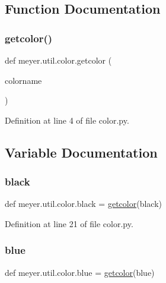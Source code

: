 \subsection{Function Documentation}
\mbox{\label{namespacemeyer_1_1util_1_1color_a777b068ba3d7bb397cb83871d691ecf5}} 
\subsubsection{\texorpdfstring{getcolor()}{getcolor()}}
{\footnotesize\ttfamily def meyer.\+util.\+color.\+getcolor (\begin{DoxyParamCaption}\item[{}]{colorname }\end{DoxyParamCaption})}



Definition at line 4 of file color.\+py.



\subsection{Variable Documentation}
\mbox{\label{namespacemeyer_1_1util_1_1color_ada7454f7b48544c229ea2a3ae9f633ce}} 
\subsubsection{\texorpdfstring{black}{black}}
{\footnotesize\ttfamily def meyer.\+util.\+color.\+black = \hyperlink{namespacemeyer_1_1util_1_1color_a777b068ba3d7bb397cb83871d691ecf5}{getcolor}(\textquotesingle{}black\textquotesingle{})}



Definition at line 21 of file color.\+py.

\mbox{\label{namespacemeyer_1_1util_1_1color_a1c7941d82b45afd60754e5974263b99d}} 
\subsubsection{\texorpdfstring{blue}{blue}}
{\footnotesize\ttfamily def meyer.\+util.\+color.\+blue = \hyperlink{namespacemeyer_1_1util_1_1color_a777b068ba3d7bb397cb83871d691ecf5}{getcolor}(\textquotesingle{}blue\textquotesingle{})}



